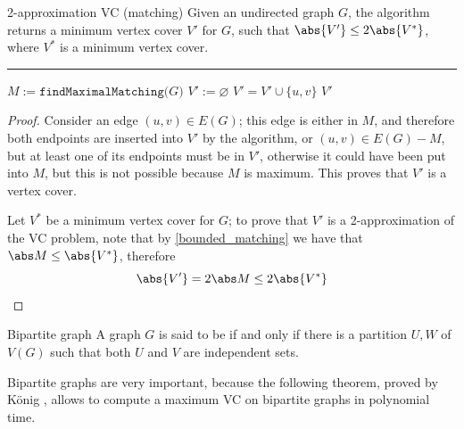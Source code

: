 \documentclass[a4paper, 12pt]{report}
\begin{document}
    \begin{framedalgo}{2-approximation VC (matching)}
        Given an undirected graph $G$, the algorithm returns a minimum vertex cover $V'$ for $G$, such that $\abs{V'} \le 2 \abs {V^*}$, where $V^*$ is a minimum vertex cover. \\
        \hrule

        \quad
        \label{alg:2-approx_vc_matching}
        \begin{algorithmic}[1]
                \State $M := \texttt{findMaximalMatching(}G\texttt{)}$
                \State $V' := \varnothing$
                    \State $V' = V' \cup \{u, v\}$
                \EndFor
                \State {} $V'$
            \EndFunction
        \end{algorithmic}
    \end{framedalgo}



    \begin{proof}
        Consider an edge $(u, v) \in E(G)$; this edge is either in $M$, and therefore both endpoints are inserted into $V'$ by the algorithm, or $(u, v) \in E(G) - M$, but at least one of its endpoints must be in $V'$, otherwise it could have been put into $M$, but this is not possible because $M$ is maximum. This proves that $V'$ is a vertex cover.

        Let $V^*$ be a minimum vertex cover for $G$; to prove that $V'$ is a 2-approximation of the VC problem, note that by \cref{bounded_matching} we have that $\abs M \le \abs{V^*}$, therefore $$\abs{V'} = 2 \abs M \le 2 \abs{V^*}$$
    \end{proof}

    \begin{frameddefn}{Bipartite graph}
        A graph $G$ is said to be  if and only if there is a partition $U, W$ of $V(G)$ such that both $U$ and $V$ are independent sets.
    \end{frameddefn}

    Bipartite graphs are very important, because the following theorem, proved by König \cite{konig}, allows to compute a maximum VC on bipartite graphs in polynomial time.
\end{document}
